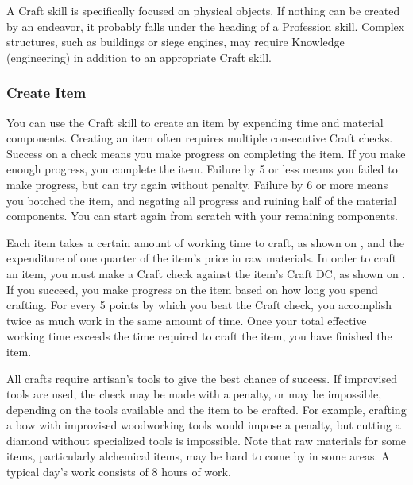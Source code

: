 A Craft skill is specifically focused on physical objects. If nothing can be created by an endeavor, it probably falls under the heading of a Profession skill. Complex structures, such as buildings or siege engines, may require Knowledge (engineering) in addition to an appropriate Craft skill.

\subsubsection{Create Item}
You can use the Craft skill to create an item by expending time and material components. Creating an item often requires multiple consecutive Craft checks. Success on a check means you make progress on completing the item. If you make enough progress, you complete the item. Failure by 5 or less means you failed to make progress, but can try again without penalty. Failure by 6 or more means you botched the item, and negating all progress and ruining half of the material components. You can start again from scratch with your remaining components.

Each item takes a certain amount of working time to craft, as shown on , and the expenditure of one quarter of the item's price in raw materials. In order to craft an item, you must make a Craft check against the item's Craft DC, as shown on . If you succeed, you make progress on the item based on how long you spend crafting. For every 5 points by which you beat the Craft check, you accomplish twice as much work in the same amount of time. Once your total effective working time exceeds the time required to craft the item, you have finished the item.

All crafts require artisan's tools to give the best chance of success. If improvised tools are used, the check may be made with a penalty, or may be impossible, depending on the tools available and the item to be crafted. For example, crafting a bow with improvised woodworking tools would impose a  penalty, but cutting a diamond without specialized tools is impossible. Note that raw materials for some items, particularly alchemical items, may be hard to come by in some areas. A typical day's work consists of 8 hours of work.

